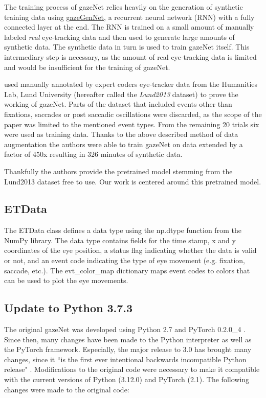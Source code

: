 \documentclass[conference]{IEEEtran}
\begin{document}
The training process of gazeNet relies heavily on the generation of synthetic training data using \href{https://github.com/r-zemblys/gazeGenNet}{gazeGenNet}, a recurrent neural network (RNN) with a fully connected layer at the end. The RNN is trained on a small amount of manually labeled \emph{real} eye-tracking data and then used to generate large amounts of synthetic data. The synthetic data in turn is used to train gazeNet itself. This intermediary step is necessary, as the amount of real eye-tracking data is limited and would be insufficient for the training of gazeNet. \cite{zemblys2018gazeNet}

\cite{zemblys2018gazeNet} used manually annotated by expert coders eye-tracker data from the Humanities Lab, Lund University (hereafter called the \emph{Lund2013} dataset) to prove the working of gazeNet. Parts of the dataset that included events other than fixations, saccades or post saccadic oscillations were discarded, as the scope of the paper was limited to the mentioned event types. From the remaining 20 trials six were used as training data. Thanks to the above described method of data augmentation the authors were able to train gazeNet on data extended by a factor of 450x resulting in 326 minutes of synthetic data.

Thankfully the authors provide the pretrained model stemming from the Lund2013 dataset free to use. Our work is centered around this pretrained model.

\subsection{ETData}
The ETData class defines a data type using the np.dtype function from the NumPy library. The data type contains fields for the time stamp, x and y coordinates of the eye position, a status flag indicating whether the data is valid or not, and an event code indicating the type of eye movement (e.g. fixation, saccade, etc.). The evt\_color\_map dictionary maps event codes to colors that can be used to plot the eye movements.


\subsection{Update to Python 3.7.3}
The original gazeNet was developed using Python 2.7 and PyTorch 0.2.0\_4 \cite{zemblys2018gazeNet}. Since then, many changes have been made to the Python interpreter as well as the PyTorch framework. Especially, the major release to 3.0 has brought many changes, since it ``is the first ever intentional backwards incompatible Python release" \cite{van_Rossum_2009}. Modifications to the original code were necessary to make it compatible with the current versions of Python (3.12.0) and PyTorch (2.1). The following changes were made to the original code:
\end{document}
